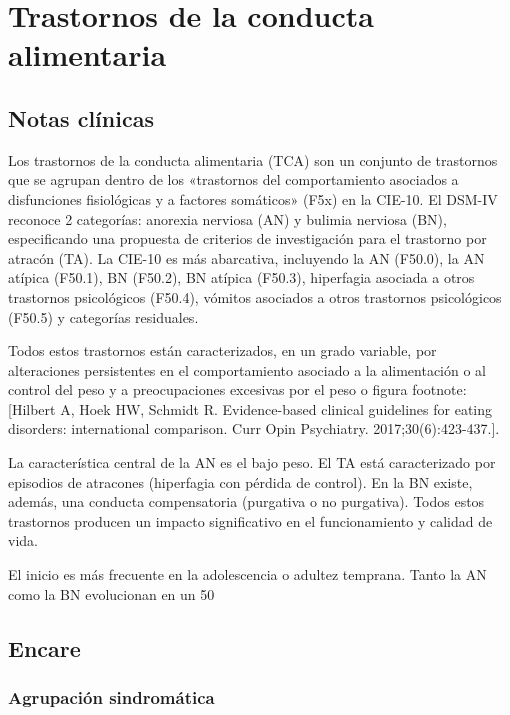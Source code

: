 \chapter{Trastornos de la conducta alimentaria}
\section*{Notas clínicas}
Los trastornos de la conducta alimentaria (TCA) son un conjunto de trastornos que se agrupan dentro de los «trastornos del comportamiento asociados a disfunciones fisiológicas y a factores somáticos» (F5x) en la CIE-10. El DSM-IV reconoce 2 categorías: anorexia nerviosa (AN) y bulimia nerviosa (BN), especificando una propuesta de criterios de investigación para el trastorno por atracón (TA). La CIE-10 es más abarcativa, incluyendo la AN (F50.0), la AN atípica (F50.1), BN (F50.2), BN atípica (F50.3), hiperfagia asociada a otros trastornos psicológicos (F50.4), vómitos asociados a otros trastornos psicológicos (F50.5) y categorías residuales.

Todos estos trastornos están caracterizados, en un grado variable, por alteraciones persistentes en el comportamiento asociado a la alimentación o al control del peso y a preocupaciones excesivas por el peso o figura footnote:[Hilbert A, Hoek HW, Schmidt R. Evidence-based clinical guidelines for eating disorders: international comparison. Curr Opin Psychiatry. 2017;30(6):423-437.].

La característica central de la AN es el bajo peso. El TA está caracterizado por episodios de atracones (hiperfagia con pérdida de control). En la BN existe, además, una conducta compensatoria (purgativa o no purgativa). Todos estos trastornos producen un impacto significativo en el funcionamiento y calidad de vida.

El inicio es más frecuente en la adolescencia o adultez temprana. Tanto la AN como la BN evolucionan en un 50%

\section*{Encare}
\subsection*{Agrupación sindromática}
